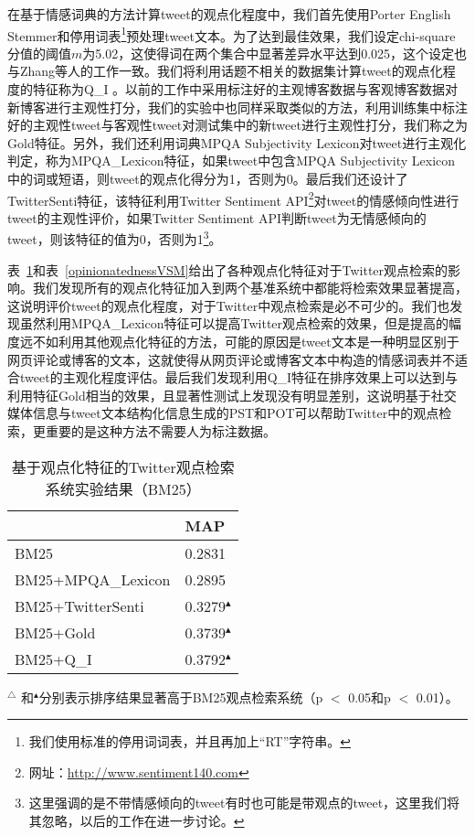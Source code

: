 在基于情感词典的方法计算tweet的观点化程度中，我们首先使用Porter English Stemmer和停用词表\footnote{我们使用标准的停用词词表，并且再加上“RT”字符串。}预处理tweet文本。为了达到最佳效果，我们设定chi-square分值的阈值$m$为5.02，这使得词在两个集合中显著差异水平达到0.025，这个设定也与Zhang等人的工作一致。我们将利用话题不相关的数据集计算tweet的观点化程度的特征称为Q\_I 。以前的工作中采用标注好的主观博客数据与客观博客数据对新博客进行主观性打分，我们的实验中也同样采取类似的方法，利用训练集中标注好的主观性tweet与客观性tweet对测试集中的新tweet进行主观性打分，我们称之为Gold特征。另外，我们还利用词典MPQA Subjectivity Lexicon对tweet进行主观化判定，称为MPQA\_Lexicon特征，如果tweet中包含MPQA Subjectivity Lexicon中的词或短语，则tweet的观点化得分为1，否则为0。最后我们还设计了TwitterSenti特征，该特征利用Twitter Sentiment API\footnote{网址：\url{http://www.sentiment140.com}}对tweet的情感倾向性进行tweet的主观性评价，如果Twitter Sentiment API判断tweet为无情感倾向的tweet，则该特征的值为0，否则为1\footnote{这里强调的是不带情感倾向的tweet有时也可能是带观点的tweet，这里我们将其忽略，以后的工作在进一步讨论。}。

表~\ref{opinionatednessBM25}和表~\ref{opinionatednessVSM}给出了各种观点化特征对于Twitter观点检索的影响。我们发现所有的观点化特征加入到两个基准系统中都能将检索效果显著提高，这说明评价tweet的观点化程度，对于Twitter中观点检索是必不可少的。我们也发现虽然利用MPQA\_Lexicon特征可以提高Twitter观点检索的效果，但是提高的幅度远不如利用其他观点化特征的方法，可能的原因是tweet文本是一种明显区别于网页评论或博客的文本，这就使得从网页评论或博客文本中构造的情感词表并不适合tweet的主观化程度评估。最后我们发现利用Q\_I特征在排序效果上可以达到与利用特征Gold相当的效果，且显著性测试上发现没有明显差别，这说明基于社交媒体信息与tweet文本结构化信息生成的PST和POT可以帮助Twitter中的观点检索，更重要的是这种方法不需要人为标注数据。

\begin{table}
 \centering
   \caption{基于观点化特征的Twitter观点检索系统实验结果（BM25）}
   \label{opinionatednessBM25}
 \begin{tabular}{|l l|}
 \hline
 & MAP \\
 \hline
BM25 & 0.2831\\
 \hline
BM25+MPQA\_Lexicon&0.2895\\
BM25+TwitterSenti &0.3279$^\blacktriangle$\\
BM25+Gold&0.3739$^\blacktriangle$\\
BM25+Q\_I&0.3792$^\blacktriangle$\\
 \hline
 \end{tabular}
     \begin{tablenotes}
        \footnotesize
\item $^\triangle$ 和$^\blacktriangle$分别表示排序结果显著高于BM25观点检索系统（p $<$ 0.05和p $<$ 0.01）。
\end{tablenotes}
 \end{table}

